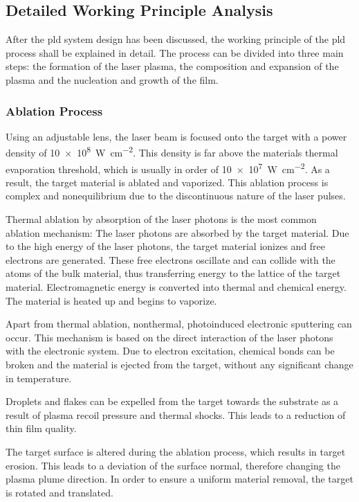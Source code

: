 \subsection{Detailed Working Principle Analysis}
After the \ac{pld} system design has been discussed, the working principle of the
\ac{pld} process shall be explained in detail.
The process can be divided into three main steps: the formation of the laser plasma,
the composition and expansion of the plasma and the nucleation and growth of the film.

\subsubsection{Ablation Process}
Using an adjustable lens, the laser beam is focused onto the target 
with a power density of \qty{10e8}{\watt\per\centi\meter\squared}.
This density is far above the materials thermal evaporation threshold, which is usually 
in order of \qty{10e7}{\watt\per\centi\meter\squared}.
As a result, the target material is ablated and vaporized.
This ablation process is complex and nonequilibrium due to the discontinuous nature 
of the laser pulses.

Thermal ablation by absorption of the laser photons is the most common ablation 
mechanism:
The laser photons are absorbed by the target material.
Due to the high energy of the laser photons, the target material ionizes and 
free electrons are generated.
These free electrons oscillate and can collide with the atoms of the bulk material,
thus transferring energy to the lattice of the target material.
Electromagnetic energy is converted into thermal and chemical energy.
The material is heated up and begins to vaporize.

Apart from thermal ablation, nonthermal, photoinduced electronic sputtering can occur.
This mechanism is based on the direct interaction of the laser photons with the 
electronic system.
Due to electron excitation, chemical bonds can be broken and the material is ejected
from the target, without any significant change in temperature.

Droplets and flakes can be expelled from the target towards the substrate as a result
of plasma recoil pressure and thermal shocks. 
This leads to a reduction of thin film quality.

The target surface is altered during the ablation process, which results in target 
erosion.
This leads to a deviation of the surface normal, therefore changing the plasma 
plume direction.
In order to ensure a uniform material removal, the target is rotated and translated.

